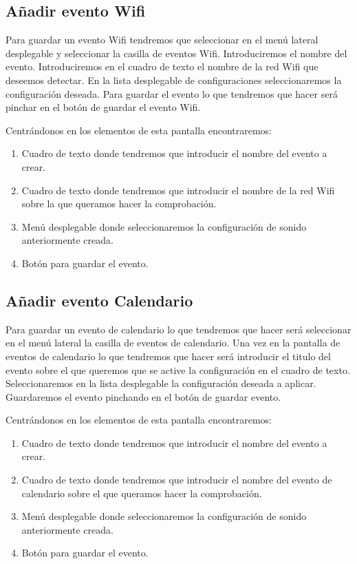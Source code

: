 \subsection{Añadir evento Wifi}
Para guardar un evento Wifi tendremos que seleccionar en el menú lateral desplegable y seleccionar la casilla de eventos Wifi.
Introduciremos el nombre del evento.
Introduciremos en el cuadro de texto el nombre de la red Wifi que deseemos detectar.
En la lista desplegable de configuraciones seleccionaremos la configuración deseada.
Para guardar el evento lo que tendremos que hacer será pinchar en el botón de guardar el evento Wifi.

Centrándonos en los elementos de esta pantalla encontraremos:
\begin{enumerate}
\item Cuadro de texto donde tendremos que introducir el nombre del evento a crear.
\item Cuadro de texto donde tendremos que introducir el nombre de la red Wifi sobre la que queramos hacer la comprobación.
\item Menú desplegable donde seleccionaremos la configuración de sonido anteriormente creada.
\item Botón para guardar el evento.
\end{enumerate}



\subsection{Añadir evento Calendario}
Para guardar un evento de calendario lo que tendremos que hacer será seleccionar en el menú lateral la casilla de eventos de calendario.
Una vez en la pantalla de eventos de calendario lo que tendremos que hacer será introducir el titulo del evento sobre el que queremos que se active la configuración en el cuadro de texto.
Seleccionaremos en la lista desplegable la configuración deseada a aplicar.
Guardaremos el evento pinchando en el botón de guardar evento.

Centrándonos en los elementos de esta pantalla encontraremos:
\begin{enumerate}
\item Cuadro de texto donde tendremos que introducir el nombre del evento a crear.
\item Cuadro de texto donde tendremos que introducir el nombre del evento de calendario sobre el que queramos hacer la comprobación.
\item Menú desplegable donde seleccionaremos la configuración de sonido anteriormente creada.
\item Botón para guardar el evento.
\end{enumerate}

